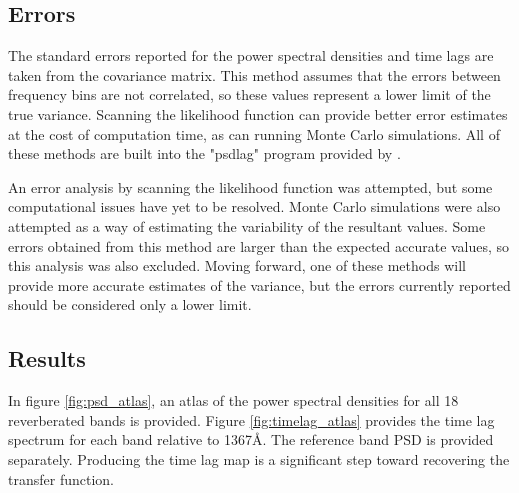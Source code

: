\documentclass[11pt,letterpaper]{article}
\begin{document}
    \subsection{Errors}
	The standard errors reported for the power spectral densities and time lags are taken from the covariance matrix. This method assumes that the errors between frequency bins are not correlated, so these values represent a lower limit of the true variance. Scanning the likelihood function can provide better error estimates at the cost of computation time, as can running Monte Carlo simulations. All of these methods are built into the "psdlag" program provided by \cite{2013ApJ...777...24Z}.

    An error analysis by scanning the likelihood function was attempted, but some computational issues have yet to be resolved. Monte Carlo simulations were also attempted as a way of estimating the variability of the resultant values. Some errors obtained from this method are larger than the expected accurate values, so this analysis was also excluded. Moving forward, one of these methods will provide more accurate estimates of the variance, but the errors currently reported should be considered only a lower limit.

    \subsection{Results}
    \label{results}

    In figure \ref{fig:psd_atlas}, an atlas of the power spectral densities for all 18 reverberated bands is provided. Figure \ref{fig:timelag_atlas} provides the time lag spectrum for each band relative to 1367\AA. The reference band PSD is provided separately. Producing the time lag map is a significant step toward recovering the transfer function.
\end{document}
